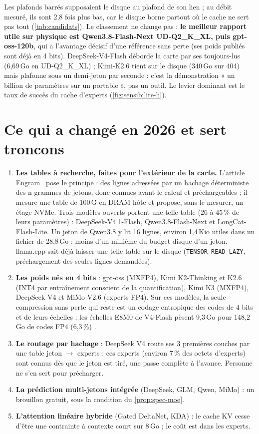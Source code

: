 \noindent Les plafonds barrés supposaient le disque au plafond de son lien ; au débit mesuré, ils sont 2,8 fois plus bas, car le disque borne partout où le cache ne sert pas tout (\cref{tab:candidats}). Le classement ne change pas : \textbf{le meilleur rapport utile sur physique est Qwen3.8-Flash-Next UD-Q2\_K\_XL, puis gpt-oss-120b}, qui a l'avantage décisif d'une référence sans perte (ses poids publiés sont déjà en 4 bits). DeepSeek-V4-Flash déborde la carte par ses toujours-lus (6,69\,Go en UD-Q2\_K\_XL) ; Kimi-K2.6 tient sur le disque (340\,Go sur 404) mais plafonne sous un demi-jeton par seconde : c'est la démonstration « un billion de paramètres sur un portable », pas un outil. Le levier dominant est le taux de succès du cache d'experts (\cref{fig:sensibilite-h}).

\section{Ce qui a changé en 2026 et sert troncons}

\begin{enumerate}
\item \textbf{Les tables à recherche, faites pour l'extérieur de la carte.} L'article Engram~\cite{engram2026} pose le principe : des lignes adressées par un hachage déterministe des n-grammes de jetons, donc connues avant le calcul et préchargeables ; il mesure une table de 100\,G en DRAM hôte et propose, sans le mesurer, un étage NVMe. Trois modèles ouverts portent une telle table (26 à 45\,\% de leurs paramètres) : DeepSeek-V4.1-Flash, Qwen3.8-Flash-Next et LongCat-Flash-Lite. Un jeton de Qwen3.8 y lit 16 lignes, environ 1,4\,Kio utiles dans un fichier de 28,8\,Go \calc : moins d'un millième du budget disque d'un jeton. llama.cpp sait déjà laisser une telle table sur le disque (\texttt{TENSOR\_READ\_LAZY}, préchargement des seules lignes demandées).
\item \textbf{Les poids nés en 4 bits} : gpt-oss (MXFP4), Kimi K2-Thinking et K2.6 (INT4 par entraînement conscient de la quantification), Kimi K3 (MXFP4), DeepSeek V4 et MiMo V2.6 (experts FP4). Sur ces modèles, la seule compression sans perte qui reste est un codage entropique des codes de 4 bits et de leurs échelles ; les échelles E8M0 de V4-Flash pèsent 9,3\,Go pour 148,2\,Go de codes FP4 (6,3\,\%) \mes.
\item \textbf{Le routage par hachage} : DeepSeek V4 route ses 3 premières couches par une table jeton $\to$ experts ; ces experts (environ 7\,\% des octets d'experts) sont connus dès que le jeton est tiré, une passe complète à l'avance. Personne ne s'en sert pour précharger.
\item \textbf{La prédiction multi-jetons intégrée} (DeepSeek, GLM, Qwen, MiMo) : un brouillon gratuit, sous la condition du \cref{prop:spec-moe}.
\item \textbf{L'attention linéaire hybride} (Gated DeltaNet, KDA) : le cache KV cesse d'être une contrainte à contexte court sur 8\,Go ; le coût est dans les experts.
\end{enumerate}

